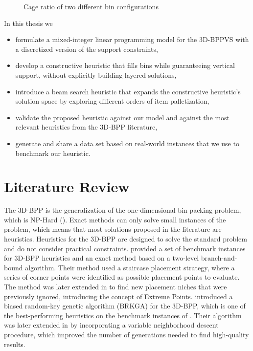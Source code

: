 \documentclass[11pt,a4paper,twocolumn]{article}
\begin{document}
\begin{figure}[h]
    \resizebox{\columnwidth}{!}{%
    
    }
    \caption{Cage ratio of two different bin configurations}
    \label{fig:cage_ratio}
\end{figure}

In this thesis we
\begin{itemize}
    \item formulate a mixed-integer linear programming model for the 3D-BPPVS with a discretized version of the support constraints,
    \item develop a constructive heuristic that fills bins while guaranteeing vertical support, without explicitly building layered solutions,
    \item introduce a beam search heuristic that expands the constructive heuristic's solution space by exploring different orders of item palletization,
    \item validate the proposed heuristic against our model and against the most relevant heuristics from the 3D-BPP literature,
    \item generate and share a data set based on real-world instances that we use to benchmark our heuristic.
\end{itemize}

\section{Literature Review}
The 3D-BPP is the generalization of the one-dimensional bin packing problem, which is NP-Hard (\cite{martello2000three}).
Exact methods can only solve small instances of the problem, which means that most solutions proposed in the literature are heuristics.
Heuristics for the 3D-BPP are designed to solve the standard problem and do not consider practical constraints.
\cite{martello2000three} provided a set of benchmark instances for 3D-BPP heuristics and an exact method based on a two-level branch-and-bound algorithm.
Their method used a staircase placement strategy, where a series of corner points were identified as possible placement points to evaluate.
The method was later extended in \cite{crainic2008extreme} to find new placement niches that were previously ignored, introducing the concept of Extreme Points.
\cite{gonccalves2013biased} introduced a biased random-key genetic algorithm (BRKGA) for the 3D-BPP, which is one of the best-performing heuristics on the benchmark instances of \cite{martello2000three}.
Their algorithm was later extended in \cite{zudio2018brkga} by incorporating a variable neighborhood descent procedure, which improved the number of generations needed to find high-quality results.
\end{document}
